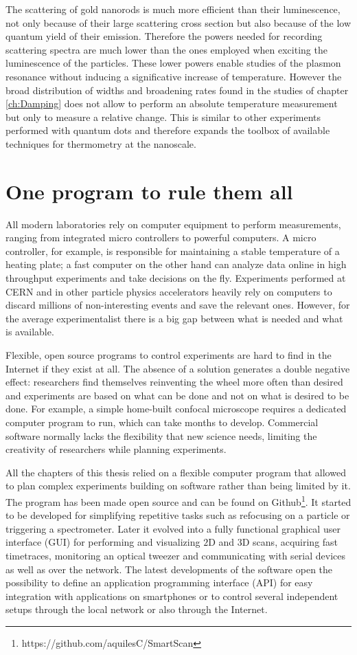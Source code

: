 The scattering of gold nanorods is much more efficient than their luminescence,
not only because of their large scattering cross section but also because of the
low quantum yield of their emission. Therefore the powers needed for recording
scattering spectra are much lower than the ones employed when exciting the
luminescence of the particles. These lower powers enable studies of the plasmon
resonance without inducing a significative increase of temperature. However the
broad distribution of widths and broadening rates found in the studies of
chapter \ref{ch:Damping} does not allow to perform an absolute temperature
measurement but only to measure a relative change. This is similar to other
experiments performed with quantum dots\cite{Yang2011a} and therefore expands
the toolbox of available techniques for thermometry at the nanoscale.

\section{One program to rule them all}
All modern laboratories rely on computer equipment to perform measurements,
ranging from integrated micro controllers to powerful computers. A micro
controller, for example, is responsible for maintaining a stable temperature of
a heating plate; a fast computer on the other hand can analyze data online in high
throughput experiments and take decisions on the fly. Experiments performed at
CERN and in other particle physics accelerators heavily rely on computers to
discard millions of non-interesting events and save the relevant ones. However, 
for the average experimentalist there is a big gap between what is needed and
what is available.

Flexible, open source programs to control experiments are hard to find in the
Internet if they exist at all. The absence of a solution generates a double
negative effect: researchers find themselves reinventing the wheel more often
than desired and experiments are based on what can be done and not on what is
desired to be done. For example, a simple home-built confocal microscope
requires a dedicated computer program to run, which can take months to develop.
Commercial software normally lacks the flexibility that new science needs,
limiting the creativity of researchers while planning experiments.

All the chapters of this thesis relied on a flexible computer program that
allowed to plan complex experiments building on software rather than being
limited by it. The program has been made open source and can be found on
Github\footnote{https://github.com/aquilesC/SmartScan}. It started to be
developed for simplifying repetitive tasks such as refocusing on a particle or
triggering a spectrometer. Later it evolved into a fully functional graphical
user interface (GUI) for performing and visualizing $2$D and $3$D scans,
acquiring fast timetraces, monitoring an optical tweezer and communicating with
serial devices as well as over the network. The latest developments of the
software open the possibility to define an application programming interface
(API) for easy integration with applications on smartphones or to control
several independent setups through the local network or also through the
Internet.

